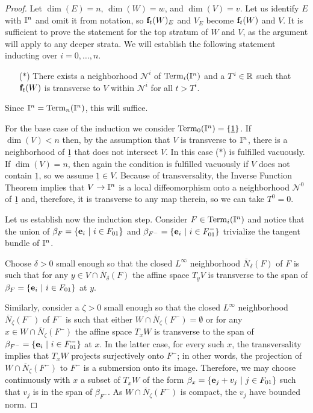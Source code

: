 \begin{proof}
	Let $\dim(E) = n$, $\dim(W) = w$, and $\dim(V) = v$.
	Let us identify $E$ with $\mathbb{I}^n$ and omit it from notation, so $\mathbf{f}_t(W)_E$ and $V_E$ become $\mathbf{f}_t(W)$ and $V$.
	It is sufficient to prove the statement for the top stratum of $W$ and $V$, as the argument will apply to any deeper strata.
	We will establish the following statement inducting over $i = 0, \dots, n$.
	\begin{itemize}
		\item[($\ast$)] There exists a neighborhood $\mathcal N^i$ of ${\rm Term}_{i}(\mathbb{I}^n)$ and a $T^i \in \mathbb{R}$ such that $\mathbf{f}_t(W)$ is transverse to $V$ within $\mathcal N^i$ for all $t > T^i$.
	\end{itemize}
	Since $\mathbb{I}^n = {\rm Term}_{n}(\mathbb{I}^n)$, this will suffice.

	For the base case of the induction we consider ${\rm Term}_0(\mathbb{I}^n) = \{\underline{1}\}$.
	If $\dim(V) < n$ then, by the assumption that $V$ is transverse to $\mathbb{I}^n$, there is a neighborhood of $\underline{1}$ that does not intersect $V$.
	In this case ($\ast$) is fulfilled vacuously.
	If $\dim(V) = n$, then again the condition is fulfilled vacuously if $V$ does not contain $\underline{1}$, so we assume $\underline{1} \in V$.
	Because of transversality, the Inverse Function Theorem implies that $V \to \mathbb{I}^n$ is a local diffeomorphism onto a neighborhood $\mathcal N^0$ of $\underline{1}$ and, therefore, it is transverse to any map therein, so we can take $T^0 = 0$.

	Let us establish now the induction step.
	Consider $F \in {\rm Term}_{i}(\mathbb{I}^n)$ and notice that the union of $\beta_F = \{\mathbf{e}_i\ |\ i \in F_{01}\}$ and $\beta_{F^-} = \{\e_i\ |\ i \in F^-_{01}\}$ trivialize the tangent bundle of $\mathbb{I}^n$.

	Choose $\delta > 0$ small enough so that the closed $L^\infty$ neighborhood $\overline N_\delta(F)$ of $F$ is such that for any $y \in V \cap \overline N_\delta(F)$ the affine space $T_yV$ is transverse to the span of $\beta_F = \{\mathbf{e}_i\ |\ i \in F_{01}\}$ at $y$.

	Similarly, consider a $\zeta > 0$ small enough so that the closed $L^\infty$ neighborhood $\overline N_\zeta(F^-)$ of $F^-$ is such that either $W \cap \overline N_\zeta(F^-) = \emptyset$ or for any $x \in W \cap \overline N_\zeta(F^-)$ the affine space $T_xW$ is transverse to the span of $\beta_{F^-} = \{\e_i\ |\ i \in F^-_{01}\}$ at $x$.
	In the latter case, for every such $x$, the transversality implies that $T_xW$ projects surjectively onto $F^-$; in other words, the projection of $W \cap \overline N_\zeta(F^-)$ to $F^-$ is a submersion onto its image. Therefore, we may choose continuously with $x$ a subset of $T_xW$ of the form $\beta_x = \{\mathbf{e}_j + v_j\ |\ j \in F_{01}\}$ such that $v_j$ is in the span of $\beta_{F^-}$.
	As $W \cap \overline N_\zeta(F^-)$ is compact, the $v_j$ have bounded norm.


\end{proof}
